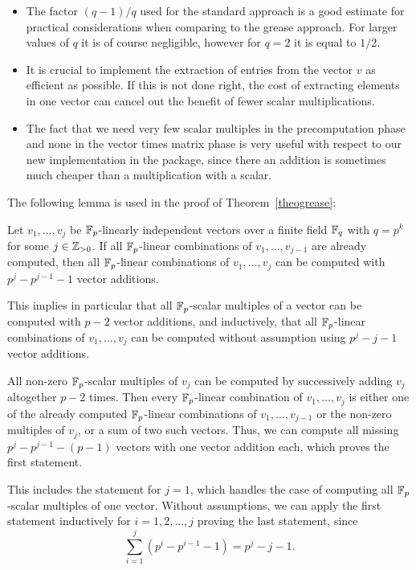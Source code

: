 \begin{Rems}
\begin{itemize}
\item The factor $(q-1)/q$ used for the standard approach is a
good estimate for practical considerations when comparing to
the grease approach. For larger values of $q$ it is of course negligible,
however for $q=2$ it is equal to $1/2$.
\item It is crucial to implement the extraction of entries
from the vector $v$ as efficient as possible. If this is not done
right, the cost of extracting elements in one vector can cancel out
the benefit of fewer scalar multiplications.
\item The fact that we need very few scalar multiples in the
precomputation phase and none in the vector times matrix phase is
very useful with respect to our new implementation in the
{\cvec} package, since there an addition is sometimes much cheaper
than a multiplication with a scalar.
\end{itemize}
\end{Rems}
 
The following lemma is used in the proof of Theorem~\ref{theogrease}:

\begin{Lemm}
\label{alllinkomb}
Let $v_1, \ldots, v_{j}$ be\/ $\mathbb{F}_p$-linearly  
independent vectors over a finite field\/ $\mathbb{F}_q$ with $q = p^k$
for some $j \in \mathbb{Z}_{> 0}$. If
all\/ $\mathbb{F}_p$-linear combinations of $v_1, \ldots, v_{j-1}$ are already
computed, then all\/ $\mathbb{F}_p$-linear combinations of $v_1, \ldots, v_j$ can
be computed with $p^j - p^{j-1} - 1$ vector additions.

This implies in particular that all\/ $\mathbb{F}_p$-scalar multiples of a vector
can be computed with $p-2$ vector additions, and inductively, that
all\/ $\mathbb{F}_p$-linear combinations of $v_1, \ldots, v_j$ can be computed
without assumption using $p^j-j-1$ vector additions.
\end{Lemm}
\Proof All non-zero $\mathbb{F}_p$-scalar multiples of $v_j$ can be computed by
successively adding $v_j$ altogether $p-2$ times. Then every $\mathbb{F}_p$-linear
combination of $v_1, \ldots, v_j$ is either one of the already
computed $\mathbb{F}_p$-linear combinations of $v_1, \ldots, v_{j-1}$ or the
non-zero multiples of $v_j$, or a sum of two such vectors. Thus, we 
can compute all missing $p^j - p^{j-1} - (p-1)$ vectors with one
vector addition each, which proves the first statement. 

This includes the statement for $j=1$, which handles the case of computing
all $\mathbb{F}_p$-scalar multiples of one vector. Without assumptions, we can
apply the first statement inductively for $i=1, 2, \ldots, j$ proving
the last statement, since
\[ \sum_{i=1}^j (p^i - p^{i-1} - 1) = p^j - j - 1. \]
\ProofEnd

